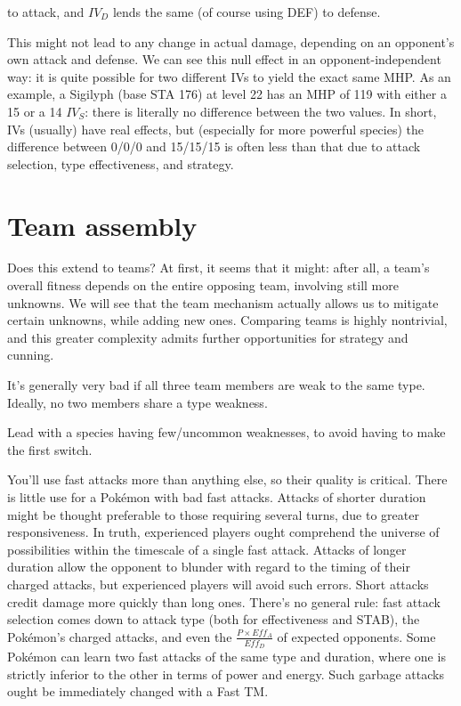 \noindent{}to attack, and $IV_D$ lends the same (of course using DEF) to defense.

This might not lead to any change in actual damage, depending on
  an opponent's own attack and defense.
We can see this null effect in an opponent-independent way: it is quite possible
  for two different IVs to yield the exact same MHP.
As an example, a Sigilyph (base STA 176) at level 22 has an MHP of 119 with
  either a 15 or a 14 $IV_S$: there is literally no difference between the
  two values.
In short, IVs (usually) have real effects, but (especially for more powerful species)
  the difference between 0/0/0 and 15/15/15 is often less than that due to
  attack selection, type effectiveness, and strategy.

\section{Team assembly}
Does this extend to teams?
At first, it seems that it might: after all, a team's overall fitness
 depends on the entire opposing team, involving still more unknowns.
We will see that the team mechanism actually allows us to mitigate certain
 unknowns, while adding new ones.
Comparing teams is highly nontrivial, and this greater complexity admits
 further opportunities for strategy and cunning.

It's generally very bad if all three team members are weak to the same type.
Ideally, no two members share a type weakness.

Lead with a species having few/uncommon weaknesses, to avoid having to make the first switch.

You'll use fast attacks more than anything else, so their quality is critical.
There is little use for a Pokémon with bad fast attacks.
Attacks of shorter duration might be thought preferable to those requiring
  several turns, due to greater responsiveness.
In truth, experienced players ought comprehend the universe of possibilities
  within the timescale of a single fast attack.
Attacks of longer duration allow the opponent to blunder with regard to the
  timing of their charged attacks, but experienced players will avoid
  such errors.
Short attacks credit damage more quickly than long ones.
There's no general rule: fast attack selection comes down to attack type
  (both for effectiveness and STAB), the Pokémon's charged attacks,
  and even the $\frac{P \times Eff_A}{Eff_D}$ of expected opponents.
Some Pokémon can learn two fast attacks of the same type and duration,
  where one is strictly inferior to the other in terms of power and
  energy.
Such garbage attacks ought be immediately changed with a Fast TM\@.

